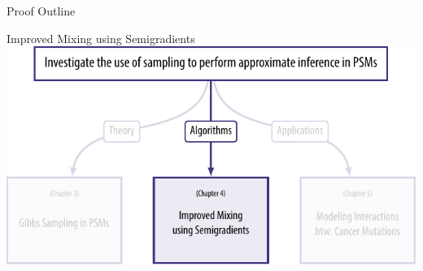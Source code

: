 \documentclass[mathserif]{beamer}
\begin{document}
\begin{frame}{Proof Outline}
%
\end{frame}

\begin{frame}{Improved Mixing using Semigradients}
\centering
\includegraphics[width=\textwidth]{figures/chapters2.pdf}
\end{frame}
\end{document}
